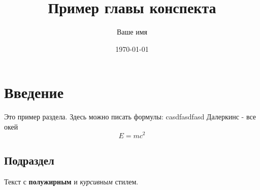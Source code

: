 \documentclass{article}
\title{Пример главы конспекта}
\author{Ваше имя}
\date{\today}
\begin{document}
\maketitle

\section{Введение}
Это пример раздела. Здесь можно писать формулы:
casdfasdfasd
Далеркинс - все окей
\[ E = mc^2 \]

\subsection{Подраздел}
Текст с \textbf{полужирным} и \emph{курсивным} стилем.
\end{document}
